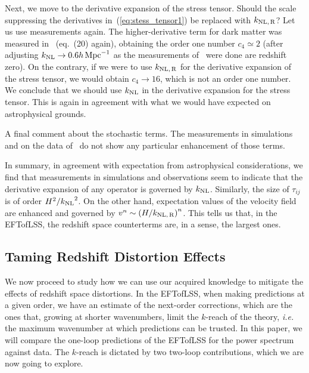 \documentclass[12pt,a4paper]{article}
\def\hinvMpc{h\,{\rm Mpc}^{-1}}
\renewcommand{\(}{\left(}
\renewcommand{\)}{\right)}
\def\knl{{k_{\rm NL}}}
\def\knlr{{k_{\rm NL,\,R}}}
\begin{document}
Next, we move to the derivative expansion of the stress tensor. Should the scale suppressing the derivatives in~(\ref{eq:stess_tensor1}) be replaced with $\knlr$? Let us use measurements again. The higher-derivative term for dark matter was measured in~\cite{Foreman:2015lca} (eq.~(20) again), obtaining the order one number $c_4\simeq 2$ (after adjusting $\knl\to 0.6\hinvMpc$ as the measurements of~\cite{Foreman:2015lca} were done are redshift zero). On the contrary, if we were to use $\knlr$ for the derivative expansion of the stress tensor, we would obtain $c_4\to16$, which is not an order one number. We conclude that we should use $\knl$ in the derivative expansion for the stress tensor. This is again in agreement with what we would have expected on astrophysical grounds.

A final comment about the stochastic terms. The measurements in simulations and on the data of~\cite{DAmico:2019fhj,Colas:2019ret} do not show any particular enhancement of those terms.

In summary, in agreement with expectation from astrophysical considerations, we find that measurements in simulations and observations seem to indicate that the derivative expansion of any operator is governed by $\knl$. Similarly, the size of $\tau_{ij}$ is of order $H^2/\knl^2$. On the other hand, expectation values of the velocity field are enhanced and governed by $v^{n}\sim \left(H/\knlr\right)^{n}$. This tells us that, in the EFTofLSS, the redshift space counterterms are, in a sense, the largest ones.


\subsection{{Taming} Redshift Distortion Effects}

We now proceed to study how we can use our acquired knowledge to mitigate the effects of redshift space distortions. In the EFTofLSS, when making predictions at a given order, we have an estimate of the next-order corrections, which are the ones that, growing at shorter wavenumbers, limit the  $k$-reach of the theory, {\it i.e.} the maximum wavenumber at which predictions can be trusted. In this paper, we will compare the one-loop predictions of the EFTofLSS for the power spectrum against data. The $k$-reach is dictated by two two-loop contributions, which we are now going to explore. 
\end{document}
